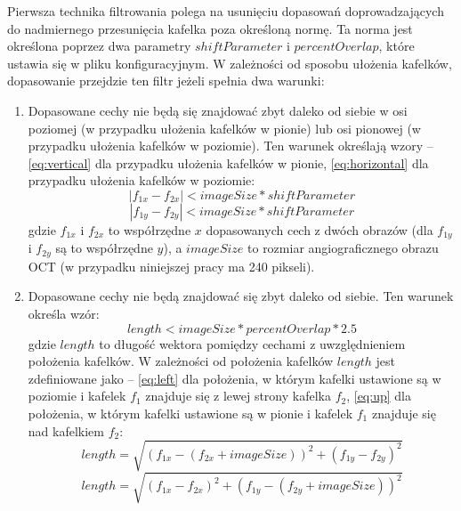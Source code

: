 Pierwsza technika filtrowania polega na usunięciu dopasowań doprowadzających do nadmiernego przesunięcia kafelka poza określoną normę. Ta norma jest określona poprzez dwa parametry $shiftParameter$ i $percentOverlap$, które ustawia się w pliku konfiguracyjnym. W zależności od sposobu ułożenia kafelków, dopasowanie przejdzie ten filtr jeżeli spełnia dwa warunki:

\begin{enumerate}
\item Dopasowane cechy nie będą się znajdować zbyt daleko od siebie w osi poziomej (w przypadku ułożenia kafelków w pionie) lub osi pionowej (w przypadku ułożenia kafelków w poziomie). Ten warunek określają wzory -- \ref{eq:vertical} dla przypadku ułożenia kafelków w pionie, \ref{eq:horizontal} dla przypadku ułożenia kafelków w poziomie:
\begin{equation}
\left|f_{1x} - f_{2x}\right| < imageSize * shiftParameter
\label{eq:vertical}
\end{equation}
\begin{equation}
\left|f_{1y} - f_{2y}\right| < imageSize * shiftParameter
\label{eq:horizontal}
\end{equation}
gdzie $f_{1x}$ i $f_{2x}$ to współrzędne $x$ dopasowanych cech z dwóch obrazów (dla $f_{1y}$ i $f_{2y}$ są to współrzędne $y$), a $imageSize$ to rozmiar angiograficznego obrazu OCT (w przypadku niniejszej pracy ma 240 pikseli).
\item Dopasowane cechy nie będą znajdować się zbyt daleko od siebie. Ten warunek określa wzór:
\begin{equation}
length < imageSize * percentOverlap * 2.5
\label{eq:length}
\end{equation}
gdzie $length$ to długość wektora pomiędzy cechami z uwzględnieniem położenia kafelków. W zależności od położenia kafelków $length$ jest zdefiniowane jako -- \ref{eq:left} dla położenia, w którym kafelki ustawione są w poziomie i kafelek $f_{1}$ znajduje się z lewej strony kafelka $f_{2}$, \ref{eq:up} dla położenia, w którym kafelki ustawione są w pionie i kafelek $f_{1}$ znajduje się nad kafelkiem $f_{2}$:
\begin{equation}
length = \sqrt{(f_{1x} - (f_{2x} + imageSize))^2 + (f_{1y} - f_{2y})^2}
\label{eq:left}
\end{equation}
\begin{equation}
length = \sqrt{(f_{1x} - f_{2x})^2 + (f_{1y} - (f_{2y} + imageSize))^2}
\label{eq:up}
\end{equation}
\end{enumerate}

